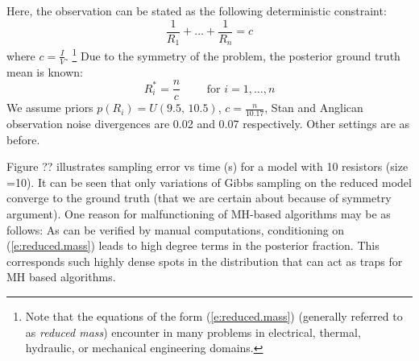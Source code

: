 \documentclass{article}
\newcommand{\pr}{p}
\begin{document}
Here, the observation can be stated as the following deterministic constraint:
\begin{equation} 
\label{e:reduced.mass}
 \frac{1}{R_1} + \ldots + \frac{1}{R_n} = c
\end{equation}
where $c = \frac{I}{V}$.
\footnote{
Note that the equations of the form (\ref{e:reduced.mass}) (generally referred to as \emph{reduced mass}) encounter in many problems in electrical, thermal, hydraulic, or mechanical engineering domains. 
}
Due to the symmetry of the problem, the posterior ground truth mean is known:
\begin{equation*}
R_i^* = \frac{n}{c} \qquad \text{ for } i = 1, \ldots, n
\end{equation*}
We assume 
priors $\pr(R_i) = U(9.5, \, 10.5)$, 
$c = \frac{n}{10.17}$,
Stan and Anglican observation noise divergences are 
0.02 and 0.07 respectively. Other settings are as before.

Figure ?? illustrates sampling error vs time (s) for a model with 10 resistors (size =10).
It can be seen that only variations of Gibbs sampling on the reduced model converge to the ground truth (that we are certain about because of symmetry argument). 
One reason for malfunctioning of MH-based algorithms may be as follows:
As can be verified by manual computations, conditioning on 
(\ref{e:reduced.mass}) leads to high degree terms in the posterior fraction. This corresponds such highly dense spots in the distribution that can act as traps for MH based algorithms.

\end{document}
